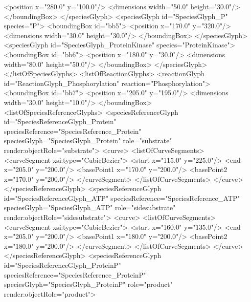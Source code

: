{\begin{example}
        <position x="280.0" y="100.0"/>
        <dimensions width="50.0" height="30.0"/>
       </boundingBox>
      </speciesGlyph>
      <speciesGlyph id="SpeciesGlyph_P" species="P">
       <boundingBox id="bb5">
        <position x="170.0" y="320.0"/>
        <dimensions width="30.0" height="30.0"/>
       </boundingBox>
      </speciesGlyph>
      <speciesGlyph id="SpeciesGlyph_ProteinKinase" 
                    species="ProteinKinase">
       <boundingBox id="bb6">
        <position x="180.0" y="30.0"/>
        <dimensions width="80.0" height="50.0"/>
       </boundingBox>
      </speciesGlyph>
     </listOfSpeciesGlyphs>
     <listOfReactionGlyphs>
      <reactionGlyph id="ReactionGlyph_Phosphorylation" 
                     reaction="Phosphorylation">
       <boundingBox id="bb7">
        <position x="205.0" y="195.0"/>
        <dimensions width="30.0" height="10.0"/>
       </boundingBox>
       <listOfSpeciesReferenceGlyphs>
        <speciesReferenceGlyph id="SpeciesReferenceGlyph_Protein" 
                               speciesReference="SpeciesReference_Protein" 
                               speciesGlyph="SpeciesGlyph_Protein" 
                               role="substrate" render:objectRole="substrate">
         <curve>
          <listOfCurveSegments>
           <curveSegment xsi:type="CubicBezier">
            <start x="115.0" y="225.0"/>
            <end x="205.0" y="200.0"/>
            <basePoint1 x="170.0" y="200.0"/>
            <basePoint2 x="170.0" y="200.0"/>
           </curveSegment>
          </listOfCurveSegments>
         </curve>
        </speciesReferenceGlyph>
        <speciesReferenceGlyph id="SpeciesReferenceGlyph_ATP" 
                               speciesReference="SpeciesReference_ATP" 
                               speciesGlyph="SpeciesGlyph_ATP" 
                               role="sidesubstrate" 
                               render:objectRole="sidesubstrate">
         <curve>
          <listOfCurveSegments>
           <curveSegment xsi:type="CubicBezier">
            <start x="160.0" y="135.0"/>
            <end x="205.0" y="200.0"/>
            <basePoint1 x="180.0" y="200.0"/>
            <basePoint2 x="180.0" y="200.0"/>
           </curveSegment>
          </listOfCurveSegments>
         </curve>
        </speciesReferenceGlyph>
        <speciesReferenceGlyph id="SpeciesReferenceGlyph_ProteinP" 
                               speciesReference="SpeciesReference_ProteinP"
                               speciesGlyph="SpeciesGlyph_ProteinP"
                               role="product" render:objectRole="product">

\end{example}}
